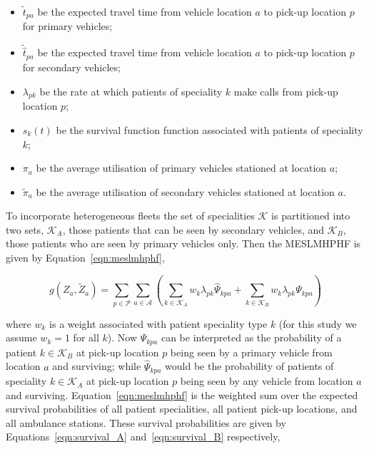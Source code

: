 \documentclass[preprint,12pt]{elsarticle}
\begin{document}
\begin{itemize}
  \item $\tilde{t}_{pa}$ be the expected travel time from vehicle location $a$
        to pick-up location $p$ for primary vehicles;
  \item $\tilde{\hat{t}}_{pa}$ be the expected travel time from vehicle
        location $a$ to pick-up location $p$ for secondary vehicles;
  \item $\lambda_{pk}$ be the rate at which patients of speciality $k$ make
        calls from pick-up location $p$;
  \item $s_k(t)$ be the survival function function associated with patients of
        speciality $k$;
  \item $\pi_a$ be the average utilisation of primary vehicles stationed at
        location $a$;
  \item $\tilde{\pi}_a$ be the average utilisation of secondary vehicles
        stationed at location $a$.
\end{itemize}

To incorporate heterogeneous fleets the set of specialities $\mathcal{K}$ is
partitioned into two sets, $\mathcal{K}_A$, those patients that can be seen by
secondary vehicles, and $\mathcal{K}_B$, those patients who are seen by
primary vehicles only. Then the MESLMHPHF is given by
Equation~\ref{eqn:meslmhphf},

\begin{equation}\label{eqn:meslmhphf}
g\left(Z_a, \tilde{Z}_a\right) =
\sum_{p \in \mathcal{P}} \sum_{a \in \mathcal{A}}
\left( \sum_{k \in \mathcal{K}_A}  w_k \lambda_{pk} \hat{\Psi}_{kpa} +
\sum_{k \in \mathcal{K}_B}  w_k \lambda_{pk} \Psi_{kpa} \right)
\end{equation}

where $w_k$ is a weight associated with patient speciality type $k$ (for this
study we assume $w_k = 1$ for all $k$). Now $\Psi_{kpa}$ can be interpreted as
the probability of a patient $k \in \mathcal{K}_B$ at pick-up location $p$
being seen by a primary vehicle from location $a$ and surviving; while
$\hat{\Psi}_{kpa}$ would be the probability of patients of speciality
$k \in \mathcal{K}_A$ at pick-up location $p$ being seen by any vehicle from
location $a$ and surviving. Equation~\ref{eqn:meslmhphf} is the weighted sum
over the expected survival probabilities of all patient specialities, all
patient pick-up locations, and all ambulance stations. These survival
probabilities are given by Equations~\ref{eqn:survival_A}
and~\ref{eqn:survival_B} respectively,
\end{document}
